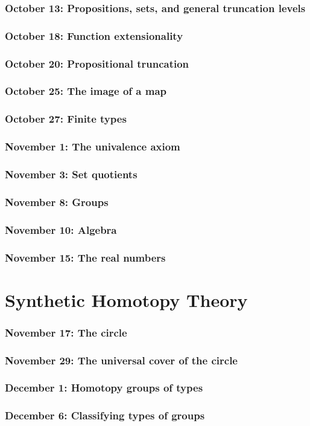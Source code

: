 \documentclass{amsart}
\theoremstyle{theorem}
\theoremstyle{definition}
\theoremstyle{remark}
\newcommand{\0}{\mathbbe{0}}
\newcommand{\1}{\mathbbe{1}}
\newcommand{\2}{\mathbbe{2}}
\newcommand{\3}{\mathbbe{3}}
\newcommand{\4}{\mathbbe{4}}
\begin{document}
\section*{October 13: Propositions, sets, and general truncation levels}
\section*{October 18: Function extensionality}
\section*{October 20: Propositional truncation}
\section*{October 25: The image of a map}
\section*{October 27: Finite types}
\section*{November 1: The univalence axiom}
\section*{November 3: Set quotients}
\section*{November 8: Groups}
\section*{November 10: Algebra}
\section*{November 15: The real numbers}


\part{Synthetic Homotopy Theory}

\section*{November 17: The circle}
\section*{November 29: The universal cover of the circle}
\section*{December 1: Homotopy groups of types}
\section*{December 6: Classifying types of groups}
\end{document}
